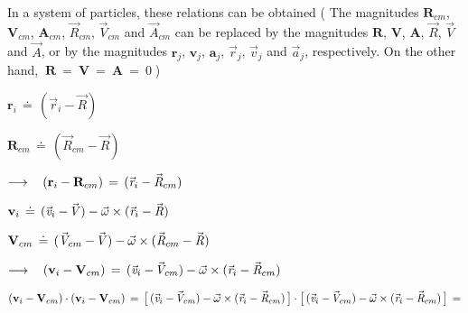 \documentclass[10pt]{article}
\begin{document}
\par \bigskip \noindent In a system of particles, these relations can be obtained ( The magnitudes ${\mathbf{R}}_{cm}$, ${\mathbf{V}}_{cm}$, ${\mathbf{A}}_{cm}$, ${\vec{\mathit{R}}}_{cm}$, ${\vec{\mathit{V}}}_{cm}$ and ${\vec{\mathit{A}}}_{cm}$ can be replaced by the magnitudes ${\mathbf{R}}$, ${\mathbf{V}}$, ${\mathbf{A}}$, ${\vec{\mathit{R}}}$, ${\vec{\mathit{V}}}$ and ${\vec{\mathit{A}}}$, or by the magnitudes ${\mathbf{r}}_j$, ${\mathbf{v}}_j$, ${\mathbf{a}}_j$, ${\vec{\mathit{r}}}_j$, ${\vec{\mathit{v}}}_j$ and ${\vec{\mathit{a}}}_j$,{\vphantom{\LARGE t}} respectively. On the other hand, $\: {\mathbf{R}} \:=\: {\mathbf{V}} \:=\: {\mathbf{A}} \:=\: 0 \;$)

\par \bigskip\medskip \noindent ${\mathbf{r}}_i \,\doteq\, ({\vec{\mathit{r}}}_i - {\vec{\mathit{R}}})$

\par \bigskip\smallskip \noindent ${\mathbf{R}}_{cm} \,\doteq\, ({\vec{\mathit{R}}}_{cm} - {\vec{\mathit{R}}})$

\par \bigskip\smallskip \noindent $\longrightarrow \hspace{+0.90em} ({\mathbf{r}}_i - {\mathbf{R}}_{cm}) \,=\, ({\vec{\mathit{r}}}_i - {\vec{\mathit{R}}}_{cm})$

\par \bigskip\smallskip \noindent ${\mathbf{v}}_i \,\doteq\, ({\vec{\mathit{v}}}_i - \hspace{-0.120em}{\vec{\mathit{V}}}) - {\vec{\omega}} \times ({\vec{\mathit{r}}}_i - {\vec{\mathit{R}}})$

\par \bigskip\smallskip \noindent ${\mathbf{V}}_{cm} \,\doteq\, ({\vec{\mathit{V}}}_{cm} - \hspace{-0.120em}{\vec{\mathit{V}}}) - {\vec{\omega}} \times ({\vec{\mathit{R}}}_{cm} - {\vec{\mathit{R}}})$

\par \bigskip\smallskip \noindent $\longrightarrow \hspace{+0.90em} ({\mathbf{v}}_i - {\mathbf{V}}_{cm}) \,=\, ({\vec{\mathit{v}}}_i - \hspace{-0.120em}{\vec{\mathit{V}}}_{cm}) - {\vec{\omega}} \times ({\vec{\mathit{r}}}_i - {\vec{\mathit{R}}}_{cm})$

\par \bigskip\smallskip \noindent $({\mathbf{v}}_i - {\mathbf{V}}_{cm}) \cdot ({\mathbf{v}}_i - {\mathbf{V}}_{cm}) \,=\, \big [ \, ({\vec{\mathit{v}}}_i - \hspace{-0.120em}{\vec{\mathit{V}}}_{cm}) - {\vec{\omega}} \times ({\vec{\mathit{r}}}_i - {\vec{\mathit{R}}}_{cm}) \, \big ] \cdot \big [ \, ({\vec{\mathit{v}}}_i - \hspace{-0.120em}{\vec{\mathit{V}}}_{cm}) - {\vec{\omega}} \times ({\vec{\mathit{r}}}_i - {\vec{\mathit{R}}}_{cm}) \, \big ] \,=$
\end{document}
